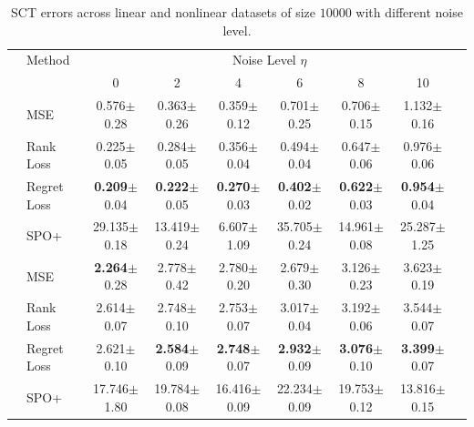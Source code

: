 \begin{table}[t]
\centering
\begin{tabular}{@{}>{\cellcolor{lightgray}}l@{\hskip 0.2in}lccccccc@{}} %
\toprule
\cellcolor{white} & Method & \multicolumn{6}{c}{Noise Level $\eta$} \\
 \cellcolor{white} &        & 0 & 2 & 4 & 6 & 8 & 10 \\
\midrule
 & MSE        & 0.576$\pm$0.28 & 0.363$\pm$0.26 & 0.359$\pm$0.12 & 0.701$\pm$0.25 & 0.706$\pm$0.15 & 1.132$\pm$0.16 \\
 & Rank Loss  & 0.225$\pm$0.05 & 0.284$\pm$0.05 & 0.356$\pm$0.04 & 0.494$\pm$0.04 & 0.647$\pm$0.06 & 0.976$\pm$0.06 \\
 & Regret Loss & \textbf{0.209}$\pm$0.04 & \textbf{0.222}$\pm$0.05 & \textbf{0.270}$\pm$0.03 & \textbf{0.402}$\pm$0.02 & \textbf{0.622}$\pm$0.03 & \textbf{0.954}$\pm$0.04 \\
 \multirow{-4}{*}{\rotatebox[origin=c]{90}{\textbf{Linear}}}  & SPO+       & 29.135$\pm$0.18 & 13.419$\pm$0.24 & 6.607$\pm$1.09 & 35.705$\pm$0.24 & 14.961$\pm$0.08 & 25.287$\pm$1.25 \\
\midrule
& MSE     & \textbf{2.264}$\pm$0.28 & 2.778$\pm$0.42 & 2.780$\pm$0.20 & 2.679$\pm$0.30 & 3.126$\pm$0.23 & 3.623$\pm$0.19 \\
& Rank Loss  & 2.614$\pm$0.07 & 2.748$\pm$0.10 & 2.753$\pm$0.07 & 3.017$\pm$0.04 & 3.192$\pm$0.06 & 3.544$\pm$0.07 \\
& Regret Loss & 2.621$\pm$0.10 & \textbf{2.584}$\pm$0.09 & \textbf{2.748}$\pm$0.07 & \textbf{2.932}$\pm$0.09 & \textbf{3.076}$\pm$0.10 & \textbf{3.399}$\pm$ 0.07\\
\multirow{-4}{*}{\rotatebox[origin=c]{90}{\textbf{NonLinear}}} & SPO+ & 17.746$\pm$1.80 & 19.784$\pm$0.08 & 16.416$\pm$0.09 & 22.234$\pm$0.09 & 19.753$\pm$0.12 & 13.816$\pm$0.15 \\
\bottomrule
\end{tabular}
\caption{SCT errors across linear and nonlinear datasets of size $10000$ with different noise level.}
\label{tab:linear_nonlinear_SCT}
\end{table}